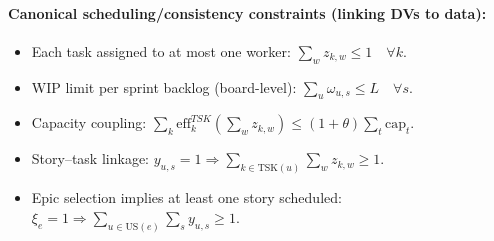 \documentclass[11pt,a4paper]{article}
\begin{document}
\paragraph{Canonical scheduling/consistency constraints (linking DVs to data):}
\begin{itemize}[leftmargin=1.2em]
  \item Each task assigned to at most one worker: $\sum_{w} z_{k,w} \le 1 \quad \forall k$.
  \item WIP limit per sprint backlog (board-level): $\sum_{u} \omega_{u,s} \le L \quad \forall s$.
  \item Capacity coupling: $\sum_{k} \mathrm{eff}^{TSK}_k \left(\sum_{w} z_{k,w}\right) \le (1+\theta)\sum_{t}\mathrm{cap}_t$.
  \item Story--task linkage: $y_{u,s}=1 \Rightarrow \sum_{k \in \mathrm{TSK}(u)} \sum_{w} z_{k,w} \ge 1$.
  \item Epic selection implies at least one story scheduled: $\xi_e = 1 \Rightarrow \sum_{u \in \mathrm{US}(e)} \sum_{s} y_{u,s} \ge 1$.
\end{itemize}
\end{document}
